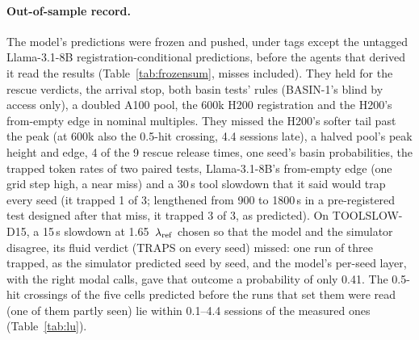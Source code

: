 \paragraph{Out-of-sample record.} The model's predictions were frozen and pushed, under tags except the untagged Llama-3.1-8B registration-conditional
predictions, before the agents that derived it read the results (Table~\ref{tab:frozensum}, misses included). They held for the rescue verdicts, the
arrival stop, both basin tests' rules (BASIN-1's blind by access only), a doubled A100 pool, the 600k H200 registration and the H200's from-empty edge in nominal
multiples. They missed the H200's softer tail past the peak (at 600k also the 0.5-hit crossing, 4.4 sessions late), a halved
pool's peak height and edge, 4 of the 9 rescue release times, one seed's basin probabilities, the trapped token rates of two
paired tests, Llama-3.1-8B's from-empty edge (one grid step high, a near miss) and a 30\,s tool slowdown that it said would
trap every seed (it trapped 1 of 3; lengthened from 900 to 1800\,s in a pre-registered test designed after that miss, it trapped 3
of 3, as predicted). On TOOLSLOW-D15, a 15\,s slowdown at 1.65~$\lambda_{\mathrm{ref}}$ chosen so that the model and the simulator disagree, its
fluid verdict (TRAPS on every seed) missed: one run of three trapped, as the simulator predicted seed by seed, and the model's
per-seed layer, with the right modal calls, gave that outcome a probability of only 0.41. The 0.5-hit crossings of the five cells
predicted before the runs that set them were read (one of them partly seen) lie within 0.1--4.4 sessions of the measured ones (Table~\ref{tab:lu}).

